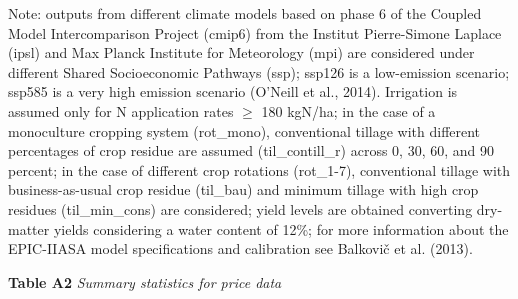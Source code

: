 \documentclass[
]{article}
\begin{document}
Note: outputs from different climate models based on phase 6 of the
Coupled Model Intercomparison Project (cmip6) from the Institut
Pierre-Simone Laplace (ipsl) and Max Planck Institute for Meteorology
(mpi) are considered under different Shared Socioeconomic Pathways
(ssp); ssp126 is a low-emission scenario; ssp585 is a very high emission
scenario (O'Neill et al., 2014). Irrigation is assumed only for N
application rates \(\geq\) 180 kgN/ha; in the case of a monoculture
cropping system (rot\_mono), conventional tillage with different
percentages of crop residue are assumed (til\_contill\_r) across 0, 30,
60, and 90 percent; in the case of different crop rotations (rot\_1-7),
conventional tillage with business-as-usual crop residue (til\_bau) and
minimum tillage with high crop residues (til\_min\_cons) are considered;
yield levels are obtained converting dry-matter yields considering a
water content of 12\%; for more information about the EPIC-IIASA model
specifications and calibration see Balkovič et al. (2013).

\textbf{\hfill\break
}

\textbf{Table A2} \emph{Summary statistics for price data}
\end{document}
